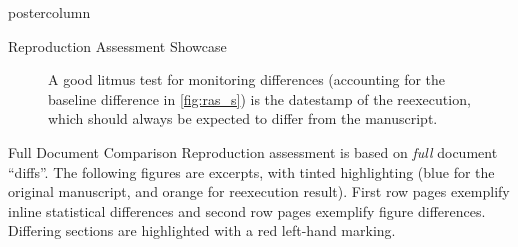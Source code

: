 \begin{frame}
\begin{columns}
\begin{column}{.59\textwidth}
\begin{beamercolorbox}[center]{postercolumn}
\begin{minipage}{.98\textwidth}
{\begin{myblock}{Reproduction Assessment Showcase}
\begin{minipage}{.38\textwidth}
\begin{figure}
							\vspace{0.5em}
							\caption{
								A good litmus test for monitoring differences (accounting for the baseline difference in \cref{fig:ras_s}) is the datestamp of the reexecution, which should always be expected to differ from the manuscript.
							}
						\end{figure}
						\end{minipage}
					\end{myblock}\vfill
					\begin{myblock}{Full Document Comparison}
						\vspace{0.25em}
						Reproduction assessment is based on \textit{full} document “diffs”.
						The following figures are excerpts, with tinted highlighting (blue for the original manuscript, and orange for reexecution result).
						First row pages exemplify inline statistical differences and second row pages exemplify figure differences.
						Differing sections are highlighted with a red left-hand marking.\\

\end{myblock}}
\end{minipage}
\end{beamercolorbox}
\end{column}
\end{columns}
\end{frame}
